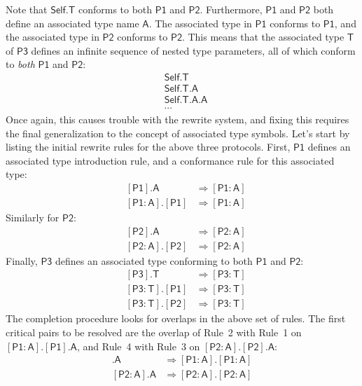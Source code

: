 \documentclass[a4paper,headsepline,bibliography=totoc,toc=flat,fleqn,twoside=semi]{scrbook}
\theoremstyle{definition}
\theoremstyle{definition}
\theoremstyle{definition}
\newcommand{\namesym}[1]{\mathsf{#1}}
\newcommand{\genericparam}[1]{\bm{\mathsf{#1}}}
\newcommand{\proto}[1]{\bm{\mathsf{#1}}}
\newcommand{\protosym}[1]{[\proto{#1}]}
\newcommand{\assocsym}[2]{[\proto{#1}\colon\namesym{#2}]}
\begin{document}
Note that $\genericparam{Self}.\namesym{T}$ conforms to both $\proto{P1}$ and $\proto{P2}$. Furthermore, $\proto{P1}$ and $\proto{P2}$ both define an associated type name $\namesym{A}$. The associated type in $\proto{P1}$ conforms to $\proto{P1}$, and the associated type in $\proto{P2}$ conforms to $\proto{P2}$. This means that the associated type $\namesym{T}$ of $\proto{P3}$ defines an infinite sequence of nested type parameters, all of which conform to \emph{both} $\proto{P1}$ and $\proto{P2}$:
\begin{align*}
&\genericparam{Self}.\namesym{T}\\
&\genericparam{Self}.\namesym{T}.\namesym{A}\\
&\genericparam{Self}.\namesym{T}.\namesym{A}.\namesym{A}\\
&\cdots
\end{align*}
Once again, this causes trouble with the rewrite system, and fixing this requires the final generalization to the concept of associated type symbols. Let's start by listing the initial rewrite rules for the above three protocols. First, $\proto{P1}$ defines an associated type introduction rule, and a conformance rule for this associated type:
\begin{align}
&\protosym{P1}.\namesym{A}&\Rightarrow\assocsym{P1}{A}\tag{1}\\
&\assocsym{P1}{A}.\protosym{P1}&\Rightarrow\assocsym{P1}{A}\tag{2}
\end{align}
Similarly for $\proto{P2}$:
\begin{align}
&\protosym{P2}.\namesym{A}&\Rightarrow\assocsym{P2}{A}\tag{3}\\
&\assocsym{P2}{A}.\protosym{P2}&\Rightarrow\assocsym{P2}{A}\tag{4}
\end{align}
Finally, $\proto{P3}$ defines an associated type conforming to both $\proto{P1}$ and $\proto{P2}$:
\begin{align}
&\protosym{P3}.\namesym{T}&\Rightarrow\assocsym{P3}{T}\tag{5}\\
&\assocsym{P3}{T}.\protosym{P1}&\Rightarrow\assocsym{P3}{T}\tag{6}\\
&\assocsym{P3}{T}.\protosym{P2}&\Rightarrow\assocsym{P3}{T}\tag{7}
\end{align}
The completion procedure looks for overlaps in the above set of rules. The first critical pairs to be resolved are the overlap of Rule~2 with Rule~1 on $\assocsym{P1}{A}.\protosym{P1}.\namesym{A}$, and Rule~4 with Rule~3 on $\assocsym{P2}{A}.\protosym{P2}.\namesym{A}$:
\begin{align}
\assocsym{P1}{A}.\namesym{A}&\Rightarrow\assocsym{P1}{A}.\assocsym{P1}{A}\tag{8}\\
\assocsym{P2}{A}.\namesym{A}&\Rightarrow\assocsym{P2}{A}.\assocsym{P2}{A}\tag{9}
\end{align}
\end{document}
